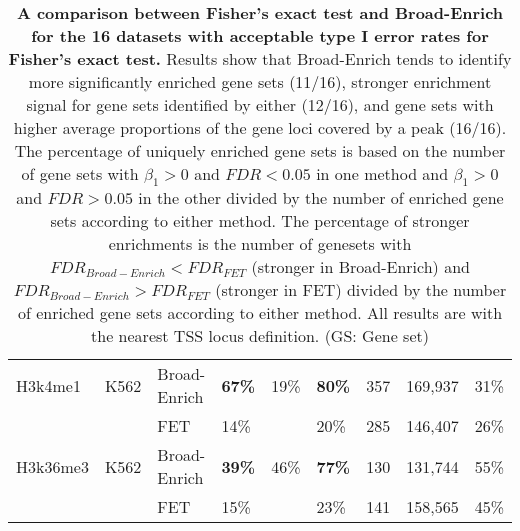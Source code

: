 \begin{sidewaystable}[!ht]
\begin{tabular}{lll|p{1.5cm}p{1.5cm}p{1.5cm}p{1.5cm}p{1.5cm}p{1.5cm}}
H3k4me1      & K562               & Broad-Enrich    & \textbf{67\%}                 & 19\%                          & \textbf{80\%}                    & 357                      & 169,937                & 31\%                     \\
             &                    & FET             & 14\%                          &                               & 20\%                             & 285                      & 146,407                & 26\%                     \\
H3k36me3     & K562               & Broad-Enrich    & \textbf{39\%}                 & 46\%                          & \textbf{77\%}                    & 130                      & 131,744                & 55\%                     \\
             &                    & FET             & 15\%                          &                               & 23\%                             & 141                      & 158,565                & 45\%
\end{tabular}
\normalsize
\caption[A comparison between Fisher's exact test and Broad-Enrich for the 16 datasets with acceptable type I error rates for Fisher's exact test.]
{
\textbf{A comparison between Fisher's exact test and Broad-Enrich for the 16 datasets with acceptable type I error rates for Fisher's exact test.}
Results show that Broad-Enrich tends to identify more significantly enriched gene sets (11/16), stronger enrichment signal for gene sets identified by either (12/16), and gene sets with higher average proportions of the gene loci covered by a peak (16/16). The percentage of uniquely enriched gene sets is based on the number of gene sets with $\beta_1 > 0$ and $FDR < 0.05$ in one method and $\beta_1 > 0$ and $FDR > 0.05$ in the other divided by the number of enriched gene sets according to either method. The percentage of stronger enrichments is the number of genesets with $FDR_{Broad-Enrich} < FDR_{FET}$ (stronger in Broad-Enrich) and $FDR_{Broad-Enrich}>FDR_{FET}$ (stronger in FET) divided by the number of enriched gene sets according to either method. All results are with the nearest TSS locus definition. (GS: Gene set)
}
\label{chap2:table:4}

\end{sidewaystable}

\newpage

